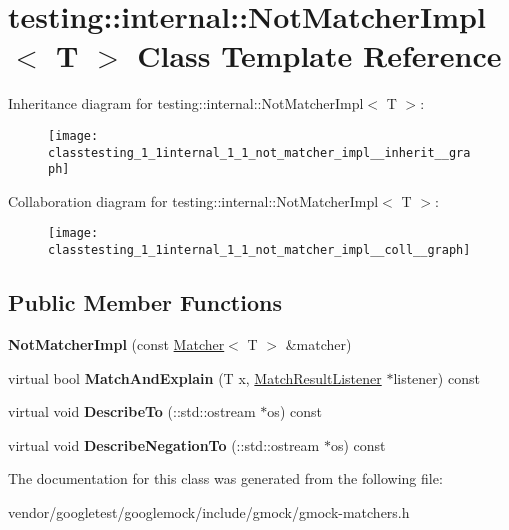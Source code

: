 \hypertarget{classtesting_1_1internal_1_1_not_matcher_impl}{}\section{testing\+:\+:internal\+:\+:Not\+Matcher\+Impl$<$ T $>$ Class Template Reference}
\label{classtesting_1_1internal_1_1_not_matcher_impl}


Inheritance diagram for testing\+:\+:internal\+:\+:Not\+Matcher\+Impl$<$ T $>$\+:
\nopagebreak
\begin{figure}[H]
\begin{center}
\leavevmode
\texttt{[image: classtesting\_1\_1internal\_1\_1\_not\_matcher\_impl\_\_inherit\_\_graph]}
\end{center}
\end{figure}


Collaboration diagram for testing\+:\+:internal\+:\+:Not\+Matcher\+Impl$<$ T $>$\+:
\nopagebreak
\begin{figure}[H]
\begin{center}
\leavevmode
\texttt{[image: classtesting\_1\_1internal\_1\_1\_not\_matcher\_impl\_\_coll\_\_graph]}
\end{center}
\end{figure}
\subsection*{Public Member Functions}
\begin{DoxyCompactItemize}
\item 
\mbox{\label{classtesting_1_1internal_1_1_not_matcher_impl_aaf35f72ebe8379f09169f4f0845cc663}} 
{\bfseries Not\+Matcher\+Impl} (const \mbox{\hyperlink{classtesting_1_1_matcher}{Matcher}}$<$ T $>$ \&matcher)
\item 
\mbox{\label{classtesting_1_1internal_1_1_not_matcher_impl_aff3743d9ffcd6dc54b389b5e23caacf3}} 
virtual bool {\bfseries Match\+And\+Explain} (T x, \mbox{\hyperlink{classtesting_1_1_match_result_listener}{Match\+Result\+Listener}} $\ast$listener) const
\item 
\mbox{\label{classtesting_1_1internal_1_1_not_matcher_impl_a2c22d3e15126decd9c6af132d4f4b60f}} 
virtual void {\bfseries Describe\+To} (\+::std\+::ostream $\ast$os) const
\item 
\mbox{\label{classtesting_1_1internal_1_1_not_matcher_impl_a960f799e25ba7264d0d45fa61bb9271c}} 
virtual void {\bfseries Describe\+Negation\+To} (\+::std\+::ostream $\ast$os) const
\end{DoxyCompactItemize}


The documentation for this class was generated from the following file\+:\begin{DoxyCompactItemize}
\item 
vendor/googletest/googlemock/include/gmock/gmock-\/matchers.\+h\end{DoxyCompactItemize}
